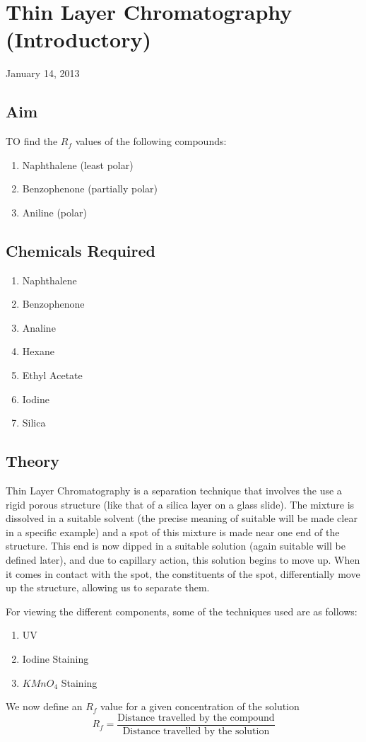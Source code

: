 \chapter{Thin Layer Chromatography (Introductory)}
\begin{flushright}
January 14, 2013
\end{flushright}
\section{Aim}
TO find the $R_f$ values of the following compounds:
\begin{enumerate}
	\item Naphthalene (least polar)
	\item Benzophenone (partially polar)
	\item Aniline (polar)
\end{enumerate}

\section {Chemicals Required}
	\begin{enumerate}
		\item Naphthalene
		\item Benzophenone
		\item Analine
		\item Hexane
		\item Ethyl Acetate
		\item Iodine
		\item Silica
	\end{enumerate}

\section{Theory}
	Thin Layer Chromatography is a separation technique that involves the use a rigid porous structure (like that of a silica layer on a glass slide). The mixture is dissolved in a suitable solvent (the precise meaning of suitable will be made clear in a specific example) and a spot of this mixture is made near one end of the structure. This end is now dipped in a suitable solution (again suitable will be defined later), and due to capillary action, this solution begins to move up. When it comes in contact with the spot, the constituents of the spot, differentially move up the structure, allowing us to separate them.
	\par
	For viewing the different components, some of the techniques used are as follows:
	\begin{enumerate}
		\item UV
		\item Iodine Staining
		\item $KMnO_4$ Staining
	\end{enumerate}
	\par
	We now define an $R_f$ value for a given concentration of the solution
	\begin{equation}
		R_f=\frac {\text{Distance travelled by the compound}}{\text {Distance travelled by the solution}}
	\end{equation}

